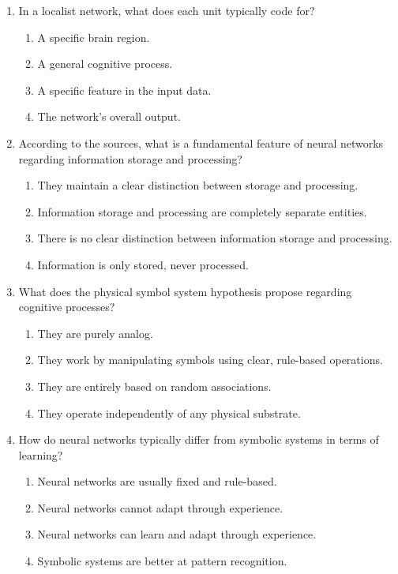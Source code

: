 \documentclass{article}
\begin{document}
\begin{enumerate}[label=\arabic*.]
\item In a localist network, what does each unit typically code for?
\begin{enumerate}[label=(\alph*)]
    \item A specific brain region.
    \item A general cognitive process.
    \item A specific feature in the input data.
    \item The network's overall output.
\end{enumerate}

\item According to the sources, what is a fundamental feature of neural networks regarding information storage and processing?
\begin{enumerate}[label=(\alph*)]
    \item They maintain a clear distinction between storage and processing.
    \item Information storage and processing are completely separate entities.
    \item There is no clear distinction between information storage and processing.
    \item Information is only stored, never processed.
\end{enumerate}

\item What does the physical symbol system hypothesis propose regarding cognitive processes?
\begin{enumerate}[label=(\alph*)]
    \item They are purely analog.
    \item They work by manipulating symbols using clear, rule-based operations.
    \item They are entirely based on random associations.
    \item They operate independently of any physical substrate.
\end{enumerate}

\item How do neural networks typically differ from symbolic systems in terms of learning?
\begin{enumerate}[label=(\alph*)]
    \item Neural networks are usually fixed and rule-based.
    \item Neural networks cannot adapt through experience.
    \item Neural networks can learn and adapt through experience.
    \item Symbolic systems are better at pattern recognition.
\end{enumerate}


\end{enumerate}
\end{document}
